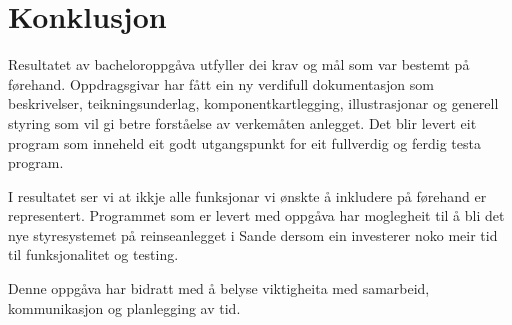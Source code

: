 \chapter{Konklusjon}
\thispagestyle{fancy}

Resultatet av bacheloroppgåva utfyller dei krav og mål som var bestemt på førehand.
Oppdragsgivar har fått ein ny verdifull dokumentasjon som beskrivelser, teikningsunderlag, komponentkartlegging,
illustrasjonar og generell styring som vil gi betre forståelse av verkemåten anlegget.
Det blir levert eit program som inneheld eit godt utgangspunkt for eit fullverdig og ferdig testa program.

I resultatet ser vi at ikkje alle funksjonar vi ønskte å inkludere på førehand er representert.
Programmet som er levert med oppgåva har moglegheit til å bli det nye styresystemet på reinseanlegget i Sande
dersom ein investerer noko meir tid til funksjonalitet og testing.

Denne oppgåva har bidratt med å belyse viktigheita med samarbeid, kommunikasjon og planlegging av tid.


